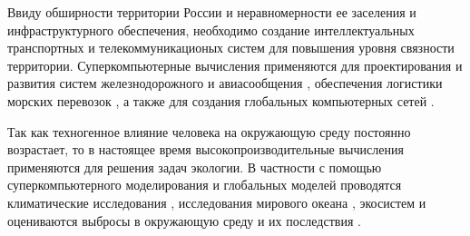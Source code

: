 Ввиду обширности территории России и неравномерности ее заселения и инфраструктурного обеспечения, необходимо создание интеллектуальных транспортных и телекоммуникационых систем для повышения уровня связности территории.
Суперкомпьютерные вычисления применяются для проектирования и развития систем железнодорожного и авиасообщения \cite{Juntana2022SuperFlight}, обеспечения логистики морских перевозок \cite{Yan2024SuperSea}, а также для создания глобальных компьютерных сетей \cite{Abramov2025SuperNets}.


Так как техногенное влияние человека на окружающую среду постоянно возрастает, то в настоящее время высокопроизводительные вычисления применяются для решения задач экологии.
В частности с помощью суперкомпьютерного моделирования и глобальных моделей проводятся климатические исследования \cite{Kulkarni2024SuperClimate}, исследования мирового океана \cite{Wei2024SuperOcean}, экосистем \cite{Rahman2024SuperSpecies} и оцениваются выбросы в окружающую среду и их последствия \cite{Ostromsky2024SuperAir}.

